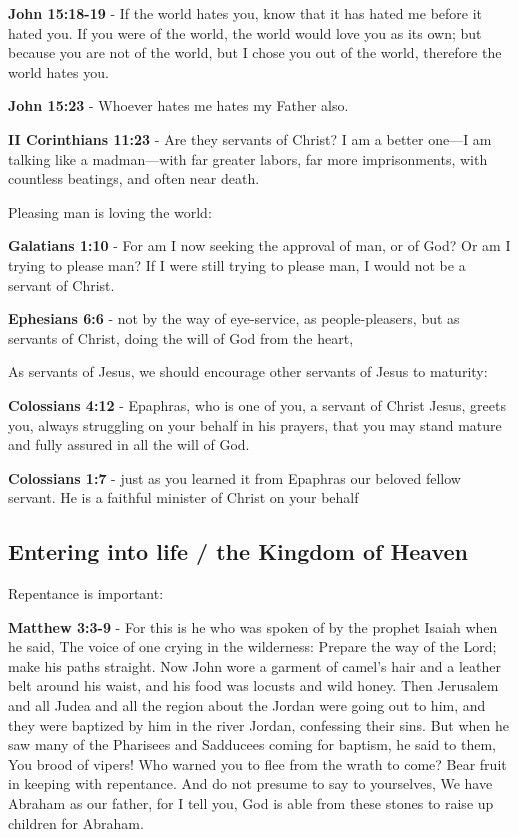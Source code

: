 \documentclass[11pt]{article}
\begin{document}
\textbf{John 15:18-19} - If the world hates you, know that it has hated me before it hated you. If you were of the world, the world would love you as its own; but because you are not of the world, but I chose you out of the world, therefore the world hates you.

\textbf{John 15:23} - Whoever hates me hates my Father also.

\textbf{II Corinthians 11:23} - Are they servants of Christ? I am a better one—I am talking like a madman—with far greater labors, far more imprisonments, with countless beatings, and often near death.

Pleasing man is loving the world:

\textbf{Galatians 1:10} - For am I now seeking the approval of man, or of God? Or am I trying to please man? If I were still trying to please man, I would not be a servant of Christ.

\textbf{Ephesians 6:6} - not by the way of eye-service, as people-pleasers, but as servants of Christ, doing the will of God from the heart,

As servants of Jesus, we should encourage other servants of Jesus to maturity:

\textbf{Colossians 4:12} - Epaphras, who is one of you, a servant of Christ Jesus, greets you, always struggling on your behalf in his prayers, that you may stand mature and fully assured in all the will of God.

\textbf{Colossians 1:7} - just as you learned it from Epaphras our beloved fellow servant. He is a faithful minister of Christ on your behalf

\subsection{Entering into life / the Kingdom of Heaven}
\label{sec:org0c2790c}
Repentance is important:

\textbf{Matthew 3:3-9} - For this is he who was spoken of by the prophet Isaiah when he said, The voice of one crying in the wilderness: Prepare the way of the Lord; make his paths straight. Now John wore a garment of camel's hair and a leather belt around his waist, and his food was locusts and wild honey. Then Jerusalem and all Judea and all the region about the Jordan were going out to him, and they were baptized by him in the river Jordan, confessing their sins. But when he saw many of the Pharisees and Sadducees coming for baptism, he said to them, You brood of vipers! Who warned you to flee from the wrath to come? Bear fruit in keeping with repentance. And do not presume to say to yourselves, We have Abraham as our father, for I tell you, God is able from these stones to raise up children for Abraham.
\end{document}
